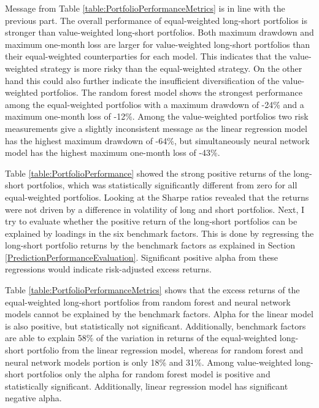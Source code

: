 \documentclass[12pt]{article}
\begin{document}
Message from Table \ref{table:PortfolioPerformanceMetrics} is in line with the previous part. The overall performance of equal-weighted long-short portfolios is stronger than value-weighted long-short portfolios. Both maximum drawdown and maximum one-month loss are larger for value-weighted long-short portfolios than their equal-weighted counterparties for each model. This indicates that the value-weighted strategy is more risky than the equal-weighted strategy. On the other hand this could also further indicate the insufficient diversification of the value-weighted portfolios. The random forest model shows the strongest performance among the equal-weighted portfolios with a maximum drawdown of -24\% and a maximum one-month loss of -12\%. Among the value-weighted portfolios two risk measurements give a slightly inconsistent message as the linear regression model has the highest maximum drawdown of -64\%, but simultaneously neural network model has the highest maximum one-month loss of -43\%. \par

Table \ref{table:PortfolioPerformance} showed the strong positive returns of the long-short portfolios, which was statistically significantly different from zero for all equal-weighted portfolios. Looking at the Sharpe ratios revealed that the returns were not driven by a difference in volatility of long and short portfolios. Next, I try to evaluate whether the positive return of the long-short portfolios can be explained by loadings in the six benchmark factors. This is done by regressing the long-short portfolio returns by the benchmark factors as explained in Section \ref{PredictionPerformanceEvaluation}. Significant positive alpha from these regressions would indicate risk-adjusted excess returns. \par

Table \ref{table:PortfolioPerformanceMetrics} shows that the excess returns of the equal-weighted long-short portfolios from random forest and neural network models cannot be explained by the benchmark factors. Alpha for the linear model is also positive, but statistically not significant. Additionally, benchmark factors are able to explain 58\% of the variation in returns of the equal-weighted long-short portfolio from the linear regression model, whereas for random forest and neural network models portion is only 18\% and 31\%. Among value-weighted long-short portfolios only the alpha for random forest model is positive and statistically significant. Additionally, linear regression model has significant negative alpha. \par
\end{document}
